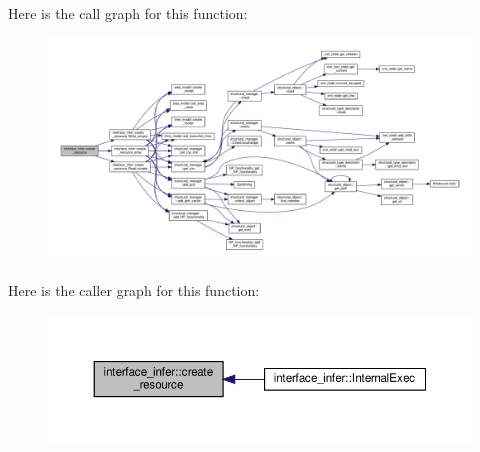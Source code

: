 Here is the call graph for this function\+:
\nopagebreak
\begin{figure}[H]
\begin{center}
\leavevmode
\includegraphics[width=350pt]{d9/d8a/classinterface__infer_adaa76ea6635a0d64f796b9ff84da3d4b_cgraph}
\end{center}
\end{figure}
Here is the caller graph for this function\+:
\nopagebreak
\begin{figure}[H]
\begin{center}
\leavevmode
\includegraphics[width=350pt]{d9/d8a/classinterface__infer_adaa76ea6635a0d64f796b9ff84da3d4b_icgraph}
\end{center}
\end{figure}
\mbox{\label{classinterface__infer_a0bff55a66fa24a9b18c1aadd1c224f87}} 
